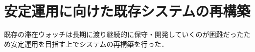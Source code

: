 





\section{安定運用に向けた既存システムの再構築}\label{4.1}

既存の滞在ウォッチは長期に渡り継続的に保守・開発していくのが困難だったため安定運用を目指す上でシステムの再構築を行った．














